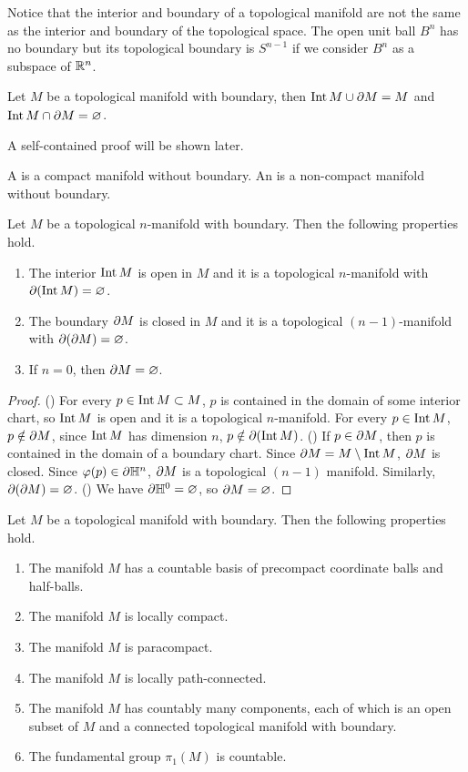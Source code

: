 \documentclass[10pt]{article}
\begin{document}
\par
Notice that the interior and boundary of a topological manifold are not the same as the interior and boundary of the topological space. The open unit ball ${B}^{n}$ has no boundary but its topological boundary is ${S}^{n-1}$ if we consider ${B}^{n}$ as a subspace of ${\mathbb{R}}^{n}$.
\begin{proposition}
    Let $M$ be a topological manifold with boundary, then $\operatorname{Int} M\cup\partial M=M$ and $\operatorname{Int} M\cap\partial M=\varnothing$.
\end{proposition}
\par
A self-contained proof will be shown later.
\begin{definition}
    A  is a compact manifold without boundary. An  is a non-compact manifold without boundary.
\end{definition}
\begin{proposition}
    Let $M$ be a topological $n$-manifold with boundary. Then the following properties hold.
    \begin{enumerate}
        \item The interior $\operatorname{Int} M$ is open in $M$ and it is a topological $n$-manifold with $\partial(\operatorname{Int} M)=\varnothing$.
        \item The boundary $\partial M$ is closed in $M$ and it is a topological $(n-1)$-manifold with $\partial(\partial M)=\varnothing$.
        \item If $n=0$, then $\partial M=\varnothing$.
    \end{enumerate}
\end{proposition}
\begin{proof}
    () For every $p\in\operatorname{Int} M\subset M$, $p$ is contained in the domain of some interior chart, so $\operatorname{Int} M$ is open and it is a topological $n$-manifold. For every $p\in\operatorname{Int} M$, $p\notin\partial M$, since $\operatorname{Int} M$ has dimension $n$, $p\notin\partial(\operatorname{Int} M)$. () If $p\in\partial M$, then $p$ is contained in the domain of a boundary chart. Since $\partial M=M\setminus\operatorname{Int} M$, $\partial M$ is closed. Since $\varphi(p)\in\partial{\mathbb{H}}^{n}$, $\partial M$ is a topological $(n-1)$ manifold. Similarly, $\partial(\partial M)=\varnothing$. () We have $\partial{\mathbb{H}}^{0}=\varnothing$, so $\partial M=\varnothing$.
\end{proof}
\begin{proposition}
    Let $M$ be a topological manifold with boundary. Then the following properties hold.
    \begin{enumerate}
        \item The manifold $M$ has a countable basis of precompact coordinate balls and half-balls.
        \item The manifold $M$ is locally compact.
        \item The manifold $M$ is paracompact.
        \item The manifold $M$ is locally path-connected.
        \item The manifold $M$ has countably many components, each of which is an open subset of $M$ and a connected topological manifold with boundary.
        \item The fundamental group ${\pi}_{1}(M)$ is countable.
    \end{enumerate}
\end{proposition}
\end{document}
